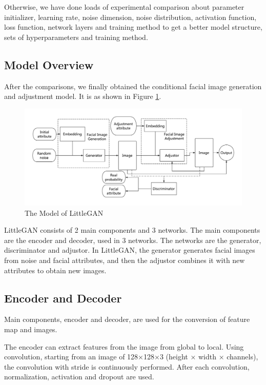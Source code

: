 Otherwise, we have done loads of experimental comparison about parameter initializer,
    learning rate, noise dimension, noise distribution, activation function,
    loss function, network layers and training method to get a better model structure,
    sets of hyperparameters and training method.

\subsection{Model Overview}

After the comparisons, we finally obtained the conditional facial image generation and adjustment model.
It is as shown in Figure \ref{smliegan}.

\begin{figure}
    \begin{center}
    \includegraphics[width=\textwidth]{figures/model.pdf}
    \caption{The Model of LittleGAN}
    \label{smliegan}
    \end{center}
\end{figure}

LittleGAN consists of 2 main components and 3 networks.
The main components are the encoder and decoder, used in 3 networks.
The networks are the generator, discriminator and adjustor.
In LittleGAN, the generator generates facial images from noise and facial attributes,
    and then the adjustor combines it with new attributes to obtain new images.


\subsection{Encoder and Decoder}


Main components, encoder and decoder, are used for the conversion of feature map and images.

The encoder can extract features from the image from global to local.
Using convolution, starting from an image of 128×128×3 (height × width × channels),
    the convolution with stride is continuously performed.
After each convolution, normalization, activation and dropout are used.


